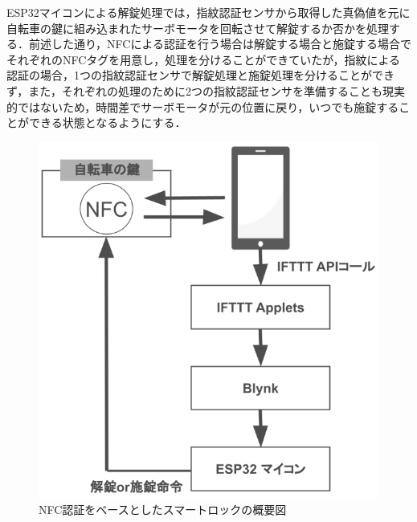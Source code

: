           \par ESP32マイコンによる解錠処理では，指紋認証センサから取得した真偽値を元に自転車の鍵に組み込まれたサーボモータを回転させて解錠するか否かを処理する．前述した通り，NFCによる認証を行う場合は解錠する場合と施錠する場合でそれぞれのNFCタグを用意し，処理を分けることができていたが，指紋による認証の場合，1つの指紋認証センサで解錠処理と施錠処理を分けることができず，また，それぞれの処理のために2つの指紋認証センサを準備することも現実的ではないため，時間差でサーボモータが元の位置に戻り，いつでも施錠することができる状態となるようにする．

          \begin{figure}[htbp]
            \centering
            \includegraphics[scale=0.36]
            {figures/overallImageOfNfcUnlock.png}
            \caption{NFC認証をベースとしたスマートロックの概要図}
            \label{fig:NFC認証をベースとしたスマートロックの概要図}
          \end{figure}
          
